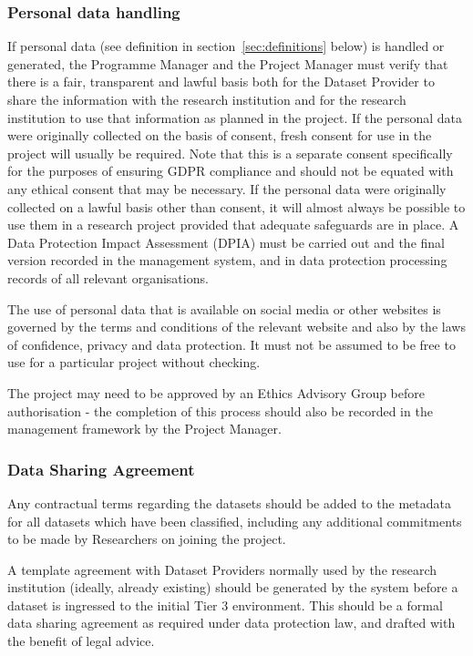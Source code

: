 \documentclass[10pt,a4paper,twocolumn]{article}
\begin{document}
\subsubsection{Personal data handling}
\label{sec:personaldata}

If personal data (see definition in section~\ref{sec:definitions} below) is handled or generated, the Programme Manager and the Project Manager must verify that 
there is a fair, transparent and lawful basis both for the Dataset Provider to share the information with the research institution and for the research institution to use that information as planned in the project. If the personal data were originally collected on the basis of consent, fresh consent for use in the project will usually be required. Note that this is a separate consent specifically for the purposes of ensuring GDPR compliance and should not be equated with any ethical consent that may be necessary. 
If the personal data were originally collected on a lawful basis other than consent, it will almost always be possible to use them in a research project provided that adequate safeguards are in place. A Data Protection Impact Assessment (DPIA) must be carried out and the final version recorded in the management system, and
in data protection processing records of all relevant organisations.

The use of personal data that is available on social media or other websites is governed by the terms and conditions of the relevant website and also by the laws of confidence, privacy and data protection. It must not be assumed to be free to use for a particular project without checking.

The project may need to be approved by an Ethics Advisory Group before authorisation - the completion of this process should also be recorded in the management framework by the Project Manager.

\subsubsection{Data Sharing Agreement}

Any contractual terms regarding the datasets should be added to the metadata for all datasets which have been classified, including any additional commitments to be made by Researchers on joining the project.

A template agreement with Dataset Providers normally used by the research institution (ideally, already existing) should be generated by the system before a dataset is ingressed to the initial Tier 3 environment. This should be a formal data sharing agreement 
as required under data protection law, and drafted with the benefit of legal advice.
\end{document}
